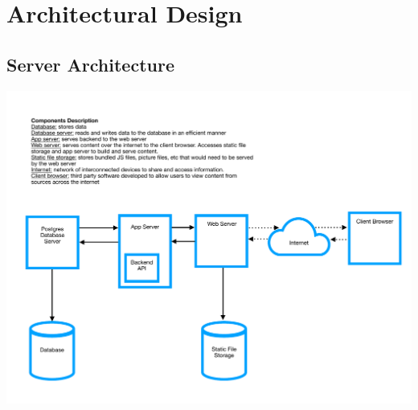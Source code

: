 \documentclass[12pt]{article}
\begin{document}

\section{Architectural Design}
\subsection{Server Architecture}
\includegraphics[scale=0.75, angle=90]{Architectural_design}
\end{document}
